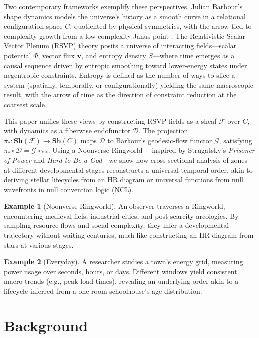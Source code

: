 \documentclass[11pt]{article}
\theoremstyle{plain}
\theoremstyle{definition}
\newtheorem{example}{Example}[section]
\begin{document}
Two contemporary frameworks exemplify these perspectives. Julian Barbour’s shape dynamics models the universe’s history as a smooth curve in a relational configuration space $C$, quotiented by physical symmetries, with the arrow tied to complexity growth from a low-complexity Janus point \citep{Barbour1999, Barbour2014}. The Relativistic Scalar--Vector Plenum (RSVP) theory posits a universe of interacting fields—scalar potential $\Phi$, vector flux $\mathbf{v}$, and entropy density $S$—where time emerges as a causal sequence driven by entropic smoothing toward lower-energy states under negentropic constraints. Entropy is defined as the number of ways to slice a system (spatially, temporally, or configurationally) yielding the same macroscopic result, with the arrow of time as the direction of constraint reduction at the coarsest scale.

This paper unifies these views by constructing RSVP fields as a sheaf $\mathscr{F}$ over $C$, with dynamics as a fiberwise endofunctor $\mathcal{D}$. The projection $\pi_*: \mathbf{Sh}(\mathcal{F}) \to \mathbf{Sh}(C)$ maps $\mathcal{D}$ to Barbour’s geodesic-flow functor $\mathcal{G}$, satisfying $\pi_* \circ \mathcal{D} = \mathcal{G} \circ \pi_*$. Using a Noonverse Ringworld— inspired by Strugatsky’s \textit{Prisoner of Power} and \textit{Hard to Be a God}—we show how cross-sectional analysis of zones at different developmental stages reconstructs a universal temporal order, akin to deriving stellar lifecycles from an HR diagram or universal functions from null wavefronts in null convention logic (NCL).

\begin{example}[Noonverse Ringworld]
An observer traverses a Ringworld, encountering medieval fiefs, industrial cities, and post-scarcity arcologies. By sampling resource flows and social complexity, they infer a developmental trajectory without waiting centuries, much like constructing an HR diagram from stars at various stages.
\end{example}

\begin{example}[Everyday]
A researcher studies a town’s energy grid, measuring power usage over seconds, hours, or days. Different windows yield consistent macro-trends (e.g., peak load times), revealing an underlying order akin to a lifecycle inferred from a one-room schoolhouse’s age distribution.
\end{example}

\section{Background}
\end{document}
